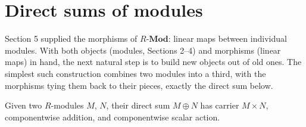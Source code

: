 \section{Direct sums of modules}\label{sec:10-modules:06-direct-sums:1}

Section 5 supplied the morphisms of \(R\text{-}\mathbf{Mod}\): linear maps between individual modules. With both objects (modules, Sections 2--4) and morphisms (linear maps) in hand, the next natural step is to build new objects out of old ones. The simplest such construction combines two modules into a third, with the morphisms tying them back to their pieces, exactly the direct sum below.

Given two \(R\)-modules \(M\), \(N\), their direct sum \(M \oplus N\) has carrier \(M \times N\), componentwise addition, and componentwise scalar action.

